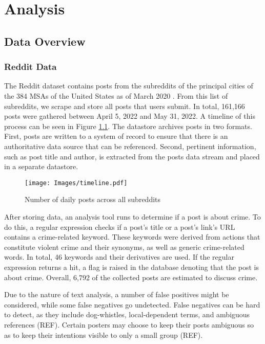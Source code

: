 \documentclass[12pt,oneside, letterpaper]{book}
\begin{document}
\chapter{Analysis}

\section{Data Overview}

\subsection{Reddit Data}
\par The Reddit dataset contains posts from the subreddits of the principal cities of the 384 MSAs of the United States as of March 2020 \cite{censusmetro}. From this list of subreddits, we scrape and store all posts that users submit. In total, 161,166 posts were gathered between April 5, 2022 and May 31, 2022. A timeline of this process can be seen in Figure \ref{fig:line-1}. The datastore archives posts in two formats. First, posts are written to a system of record to ensure that there is an authoritative data source that can be referenced. Second, pertinent information, such as post title and author, is extracted from the posts data stream and placed in a separate datastore.

\begin{figure}[ht]
    \centering
    \texttt{[image: Images/timeline.pdf]}
    \caption{Number of daily posts across all subreddits}
    \label{fig:line-1}
\end{figure}

\par After storing data, an analysis tool runs to determine if a post is about crime. To do this, a regular expression checks if a post's title or a post's link's URL contains a crime-related keyword. These keywords were derived from actions that constitute violent crime and their synonyms, as well as generic crime-related words. In total, 46 keywords and their derivatives are used. If the regular expression returns a hit, a flag is raised in the database denoting that the post is about crime. Overall, 6,792 of the collected posts are estimated to discuss crime.

\par Due to the nature of text analysis, a number of false positives might be considered, while some false negatives go undetected. False negatives can be hard to detect, as they include dog-whistles, local-dependent terms, and ambiguous references (REF). Certain posters may choose to keep their posts ambiguous so as to keep their intentions visible to only a small group (REF).
\end{document}
